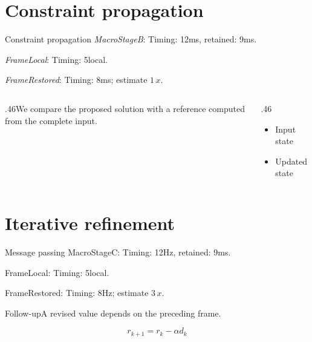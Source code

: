 \documentclass[9pt,aspectratio=43]{beamer}
\newcommand{\fuzzlayerA}[1]{\textit{#1}}
\newcommand{\fuzzlayerB}[1]{\fuzzlayerA{#1}}
\newcommand{\fuzzlayerC}[1]{\fuzzlayerB{#1}}
\newcommand{\fuzzterm}[1]{\fuzzlayerC{#1}}
\newcommand{\fuzzpair}[2]{\fuzzterm{#1}: #2}
\newcommand{\fuzzunit}{ms}
\let\fuzzoriginalunit\fuzzunit
\newcommand{\fuzzcoefficient}{1}
\newcommand{\fuzzscale}[2][\fuzzcoefficient]{#1\,#2}
\begin{document}
\section{Constraint propagation}
\begin{frame}[t]{Constraint propagation}
\fuzzpair{MacroStageB}{Timing: 12\fuzzunit, retained: 9\fuzzoriginalunit.}\par
{\renewcommand{\fuzzunit}{local}\fuzzpair{FrameLocal}{Timing: 5\fuzzunit.}\par}
\fuzzpair{FrameRestored}{Timing: 8\fuzzunit; estimate $\fuzzscale{x}$.}\par
\begin{columns}[T]\begin{column}{.46\textwidth}We compare the proposed solution with a reference computed from the complete input.\end{column}\begin{column}{.46\textwidth}\begin{itemize}\item Input state\item Updated state\end{itemize}\end{column}\end{columns}
\end{frame}
\renewcommand{\fuzzunit}{Hz}
\renewcommand{\fuzzcoefficient}{3}
\renewcommand{\fuzzterm}[1]{{\textrm{#1}}}
\section{Iterative refinement}
\begin{frame}[t]{Message passing}
\fuzzpair{MacroStageC}{Timing: 12\fuzzunit, retained: 9\fuzzoriginalunit.}\par
{\renewcommand{\fuzzunit}{local}\fuzzpair{FrameLocal}{Timing: 5\fuzzunit.}\par}
\fuzzpair{FrameRestored}{Timing: 8\fuzzunit; estimate $\fuzzscale{x}$.}\par
\begin{block}{Follow-up}\fuzzterm{A revised value} depends on the preceding frame.\end{block}
\[r_{k+1}=r_k-\alpha d_k\]
\end{frame}
\renewcommand{\fuzzunit}{us}
\renewcommand{\fuzzcoefficient}{4}
\renewcommand{\fuzzterm}[1]{{\textrm{#1}}}
\end{document}
